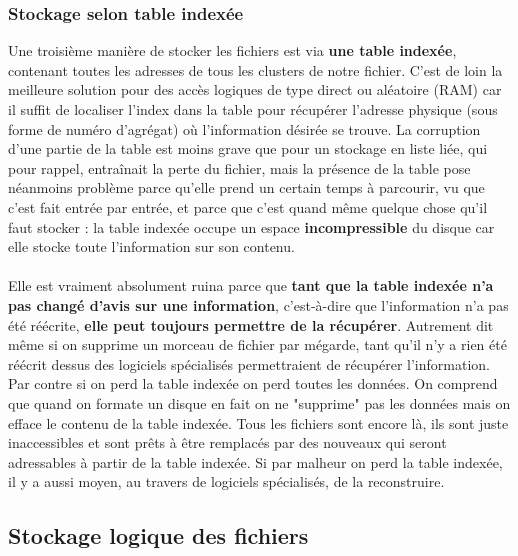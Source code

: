 \documentclass[12pt,a4paper]{report}
\begin{document}
\subsubsection{Stockage selon table indexée}
 Une troisième manière de stocker les fichiers est via \textbf{une table indexée}, contenant toutes les adresses de tous les clusters de notre fichier. C'est de loin la meilleure solution pour des accès logiques de type direct ou aléatoire (RAM) car il suffit de localiser l'index dans la table pour récupérer l'adresse physique (sous forme de numéro d'agrégat) où l'information désirée se trouve. La corruption d'une partie de la table est moins grave que pour un stockage en liste liée, qui pour rappel, entraînait la perte du fichier, mais la présence de la table pose néanmoins problème parce qu'elle prend un certain temps à parcourir, vu que c'est fait entrée par entrée, et parce que c'est quand même quelque chose qu'il faut stocker : la table indexée occupe un espace \textbf{incompressible} du disque car elle stocke toute l'information sur son contenu.\\
 \\
 Elle est vraiment absolument ruina parce que \textbf{tant que la table indexée n'a pas changé d'avis sur une information}, c'est-à-dire que l'information n'a pas été réécrite, \textbf{elle peut toujours permettre de la récupérer}. Autrement dit même si on supprime un morceau de fichier par mégarde, tant qu'il n'y a rien été réécrit dessus des logiciels spécialisés permettraient de récupérer l'information. Par contre si on perd la table indexée on perd toutes les données. On comprend que quand on formate un disque en fait on ne "supprime" pas les données mais on efface le contenu de la table indexée. Tous les fichiers sont encore là, ils sont juste inaccessibles et sont prêts à être remplacés par des nouveaux qui seront adressables à partir de la table indexée. Si par malheur on perd la table indexée, il y a aussi moyen, au travers de logiciels spécialisés, de la reconstruire.

\subsection{Stockage logique des fichiers}
\end{document}

